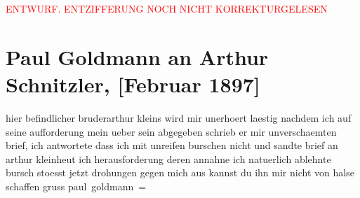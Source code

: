 
\begin{center}
            \textcolor{red}{ENTWURF. ENTZIFFERUNG NOCH NICHT KORREKTURGELESEN}
                      \end{center}
            
               \section[Paul Goldmann an Arthur Schnitzler, {[}Februar 1897{]}]{ Paul Goldmann an Arthur Schnitzler, {[}Februar 1897{]}}\nopagebreak{}\rehead{ }\begin{ledgroupsized}[t]{13cm}\normalsize\beginnumbering{} \toendnotes[C]{\smallbreak\pagebreak[2]} 
\toendnotes[C]{\smallbreak}\pstart
           \noindent{}{\pb}hier befindlicher bruderarthur kleins wird mir unerhoert laestig nachdem ich auf seine
               aufforderung mein \label{T_L02638-3v}\label{T_L02638-3h} ueber sein \label{K_L02638-1v}\label{K_L02638-1h}
               abgegeben schrieb er mir unverschaemten brief, ich antwortete dass ich mit unreifen
               burschen nicht \label{T_L02638-2v}\label{T_L02638-2h} und sandte brief an arthur kleinheut{ }\label{T_L02638-1v}\label{T_L02638-1h} ich
               herausforderung deren annahne ich natuerlich ablehnte \label{T_L02638-4v}\label{T_L02638-4h} bursch stoesst jetzt drohungen gegen mich aus
               kannst du ihn mir nicht von halse schaffen\pend
           \pstart gruss \spacefill\mbox{paul goldmann =}\pend{}\endnumbering{}\end{ledgroupsized}  \newcommand{\dateiname}{L02638}\newcommand{\titel}{Paul Goldmann an Arthur Schnitzler, [Februar 1897]}\newcommand{\editorInnen}{Martin Anton Müller und Laura Untner}
      